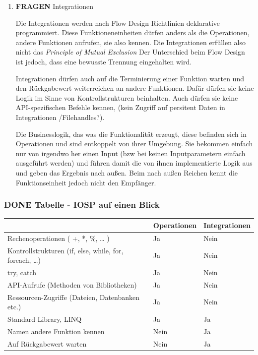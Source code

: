 \documentclass[11pt]{article}
\begin{document}
\begin{enumerate}
\item {\bfseries\sffamily FRAGEN} Integrationen
\label{sec:orgheadline31}

Die Integrationen werden nach Flow Design Richtlinien deklarative programmiert.
Diese Funktioneneinheiten dürfen anders als die Operationen, andere Funktionen aufrufen, sie also kennen.
Die Integrationen erfüllen also nicht das \emph{Principle of Mutual Exclusion}
Der Unterschied beim Flow Design ist jedoch, dass eine bewusste Trennung eingehalten wird.

Integrationen dürfen auch auf die Terminierung einer Funktion warten und den Rückgabewert  weiterreichen an andere Funktionen.
Dafür dürfen sie keine Logik im Sinne von Kontrollstrukturen beinhalten.
Auch dürfen sie keine API-spezifischen Befehle kennen, (kein Zugriff auf
persitent Daten in Integrationen /Filehandles?).

Die Businesslogik, das was die Funktionalität erzeugt, diese befinden sich in Operationen und sind entkoppelt von ihrer Umgebung.
Sie bekommen einfach nur von irgendwo her einen Input (bzw bei keinen Inputparametern einfach ausgeführt werden) und führen damit die von ihnen implementierte
Logik aus und geben das Ergebnis nach außen. Beim nach außen Reichen kennt die Funktionseinheit jedoch nicht den Empfänger.
\end{enumerate}

\subsubsection{{\bfseries\sffamily DONE} Tabelle -  IOSP auf einen Blick}
\label{sec:orgheadline33}
\begin{center}
\begin{tabular}{lll}
 & Operationen & Integrationen\\
\hline
Rechenoperationen ( +, *, \%, \ldots{} ) & Ja & Nein\\
Kontrollstrukturen (if, else, while, for, foreach, \ldots{}) & Ja & Nein\\
try, catch & Ja & Nein\\
API-Aufrufe (Methoden von Bibliotheken) & Ja & Nein\\
Ressourcen-Zugriffe (Dateien, Datenbanken etc.) & Ja & Nein\\
Standard Library, LINQ & Ja & Ja\\
Namen andere Funktion kennen & Nein & Ja\\
Auf Rückgabewert warten & Nein & Ja\\
\end{tabular}
\end{center}
\end{document}
